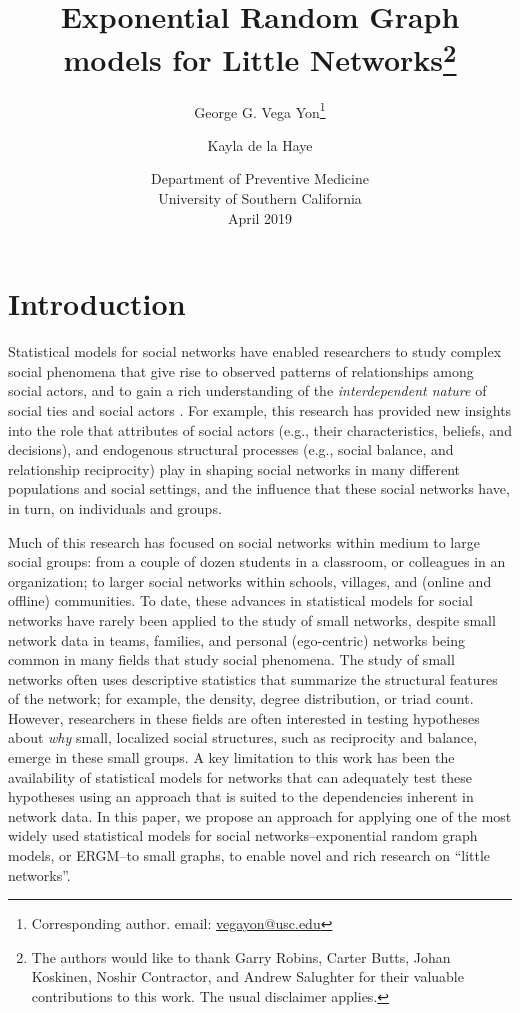 \documentclass[12pt]{article}
\title{Exponential Random Graph models for Little Networks\footnote{The authors would like to thank Garry Robins, Carter Butts, Johan Koskinen, Noshir Contractor, and Andrew Salughter for their valuable contributions to this work. The usual disclaimer applies.}}
\author{George G. Vega Yon\footnote{Corresponding author. email: \href{mailto:vegayon@usc.edu}{vegayon@usc.edu}} \and Kayla de la Haye}
\date{Department of Preventive Medicine\\University of Southern California\\ April 2019}
\begin{document}
\maketitle


\section{Introduction}

Statistical models for social networks have enabled researchers to study complex social phenomena that give rise to observed patterns of relationships among social actors, and to gain a rich understanding of the \textit{interdependent nature} of social ties and social actors \cite{Snijders2011,lusher2012exponential}. For example, this research has provided new insights into the role that attributes of social actors (e.g., their characteristics, beliefs, and decisions), and endogenous structural processes (e.g., social balance, and relationship reciprocity) play in shaping social networks in many different populations and social settings, and the influence that these social networks have, in turn, on individuals and groups. 

Much of this research has focused on social networks within medium to large social groups: from a couple of dozen students in a classroom, or colleagues in an organization; to larger social networks within schools, villages, and (online and offline) communities. To date, these advances in statistical models for social networks have rarely been applied to the study of small networks, despite small network data in teams, families, and personal (ego-centric) networks being common in many fields that study social phenomena. The study of small networks often uses descriptive statistics that summarize the structural features of the network; for example, the density, degree distribution, or triad count. However, researchers in these fields are often interested in testing hypotheses about \textit{why} small, localized social structures, such as reciprocity and balance, emerge in these small groups. A key limitation to this work has been the availability of statistical models for networks that can adequately test these hypotheses using an approach that is suited to the dependencies inherent in network data. In this paper, we propose an approach for applying one of the most widely used statistical models for social networks--exponential random graph models, or ERGM--to small graphs, to enable novel and rich research on ``little networks''. 
\end{document}
